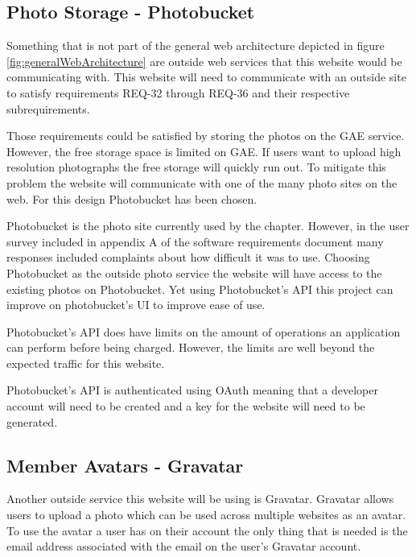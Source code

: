 \documentclass{article}
\begin{document}
\subsection{Photo Storage - Photobucket}

Something that is not part of the general web architecture depicted in figure \ref{fig:generalWebArchitecture} are outside
web services that this website would be communicating with. This website will need to communicate with an outside site to satisfy requirements REQ-32 through REQ-36 and their respective subrequirements. \cite{schwab_apo_srs_2012}

Those requirements could be satisfied by storing the photos on the GAE service. However, the free storage space is limited
on GAE. If users want to upload high resolution photographs the free storage will quickly run out. To mitigate this problem
the website will communicate with one of the many photo sites on the web. For this design Photobucket has been chosen. \cite{_photobucket_2012}

Photobucket is the photo site currently used by the chapter. However, in the user survey included in appendix A of 
the software requirements document many responses included complaints about how difficult it was to use.\cite{schwab_apo_srs_2012}  Choosing Photobucket as the outside photo service the website will have access to the existing photos on Photobucket. Yet using Photobucket's API this project can improve on photobucket's UI to improve ease of use.

Photobucket's API does have limits on the amount of operations an application can perform before being charged. \cite{photobucket_method_2010} However, the limits are well beyond the expected traffic for this website.

Photobucket's API is authenticated using OAuth meaning that a developer account will need to be created and a key for the
website will need to be generated. \cite{photobucket_faq_2010}

\subsection{Member Avatars - Gravatar}

Another outside service this website will be using is Gravatar. \cite{_gravatar} Gravatar allows users to upload a photo which can be used across multiple websites as an avatar. To use the avatar a user has on their account the only thing that is needed
is the email address associated with the email on the user's Gravatar account. 
\end{document}
